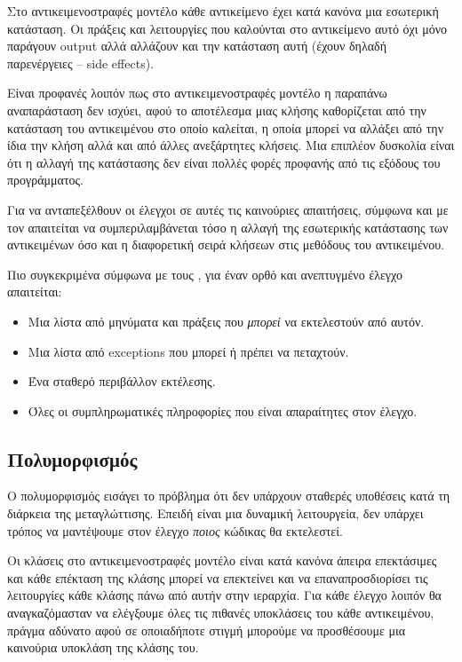 \documentclass[12pt]{article}
\begin{document}
\par Στο αντικειμενοστραφές μοντέλο κάθε αντικείμενο έχει κατά κανόνα μια εσωτερική κατάσταση. Οι πράξεις και λειτουργίες που καλούνται στο αντικείμενο αυτό όχι μόνο παράγουν output αλλά αλλάζουν και την κατάσταση αυτή (έχουν δηλαδή παρενέργειες – side effects).

\par Είναι προφανές λοιπόν πως στο αντικειμενοστραφές μοντέλο η παραπάνω αναπαράσταση δεν ισχύει, αφού το αποτέλεσμα μιας κλήσης καθορίζεται από την κατάσταση του αντικειμένου στο οποίο καλείται, η οποία μπορεί να αλλάξει από την ίδια την κλήση αλλά και από άλλες ανεξάρτητες κλήσεις. Μια επιπλέον δυσκολία είναι ότι η αλλαγή της κατάστασης δεν είναι πολλές φορές προφανής από τις εξόδους του προγράμματος.

\par Για να ανταπεξέλθουν οι έλεγχοι σε αυτές τις καινούριες απαιτήσεις, σύμφωνα και με τον  απαιτείται να συμπεριλαμβάνεται τόσο η αλλαγή της εσωτερικής κατάστασης των αντικειμένων όσο και η διαφορετική σειρά κλήσεων στις μεθόδους του αντικειμένου.

\par Πιο συγκεκριμένα σύμφωνα με τους \textcite{gordon}, για έναν ορθό και ανεπτυγμένο έλεγχο απαιτείται:

\begin{itemize}
\item Μια λίστα από μηνύματα και πράξεις που \textit{μπορεί} να εκτελεστούν από αυτόν.
\item Μια λίστα από exceptions που μπορεί ή πρέπει να πεταχτούν.
\item Ένα σταθερό περιβάλλον εκτέλεσης.
\item Όλες οι συμπληρωματικές πληροφορίες που είναι απαραίτητες στον έλεγχο.
\end{itemize}

\subsection{Πολυμορφισμός}

\par Ο πολυμορφισμός εισάγει το πρόβλημα ότι δεν υπάρχουν σταθερές υποθέσεις κατά τη διάρκεια της μεταγλώττισης. Επειδή είναι μια δυναμική λειτουργεία, δεν υπάρχει τρόπος να μαντέψουμε στον έλεγχο \textit{ποιος} κώδικας θα εκτελεστεί.

\par Οι κλάσεις στο αντικειμενοστραφές μοντέλο είναι κατά κανόνα άπειρα επεκτάσιμες και κάθε επέκταση της κλάσης μπορεί να επεκτείνει και να επαναπροσδιορίσει τις λειτουργίες κάθε κλάσης πάνω από αυτήν στην ιεραρχία. Για κάθε έλεγχο λοιπόν θα αναγκαζόμασταν να ελέγξουμε όλες τις πιθανές υποκλάσεις του κάθε αντικειμένου, πράγμα αδύνατο αφού σε οποιαδήποτε στιγμή μπορούμε να προσθέσουμε μια καινούρια υποκλάση της κλάσης του.
\end{document}
